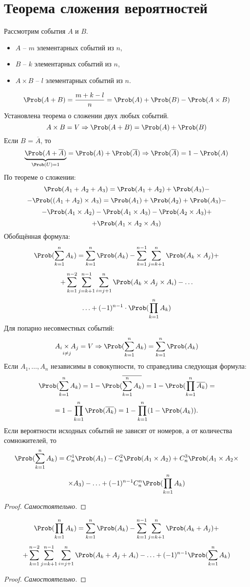 \section{Теорема сложения вероятностей}
Рассмотрим события $A$ и $B$.
\begin{itemize}
	\item $A$ -- $m$ элементарных событий из $n$,
	\item $B$ -- $k$ элементарных событий из $n$,
	\item $A \times B$ -- $l$ элементарных событий из $n$.
\end{itemize}
\[
	\Prob(A + B) = \frac{m + k - l}{n} = \Prob(A) + \Prob(B) - \Prob(A \times B)
\]
Установлена теорема о сложении двух любых событий.
\[
	A \times B = V \Rightarrow \Prob(A + B) = \Prob(A) + \Prob(B)
\]
Если $B$ = $\overline{A}$, то
\[
	\underbrace{\Prob(A + \overline{A})}_{\Prob(U) = 1} = \Prob(A) + \Prob(\overline{A}) \Rightarrow \Prob(\overline{A}) = 1 - \Prob(A)
\]
По теореме о сложении:
\[ \Prob(A_1 + A_2 + A_3) = \Prob(A_1 + A_2) + \Prob(A_3) -  \]
\[ - \Prob((A_1 + A_2) \times A_3) = \Prob(A_1) + \Prob(A_2) + \Prob(A_3) - \]	
\[ - \Prob(A_1 \times A_2) - \Prob(A_1 \times A_3) - \Prob(A_2 \times A_3) + \]
\[ + \Prob(A_1 \times A_2 \times A_3) \]
Обобщённая формула:
\[ \Prob(\sum\limits_{k=1}^n A_k) = \sum\limits_{k=1}^n \Prob(A_k) - \sum\limits_{k=1}^{n-1} \sum\limits_{j=k+1}^n \Prob(A_k \times A_j) + \]
\[
	+ \sum\limits_{k=1}^{n-2} \sum\limits_{j=k+1}^{n-1} \sum\limits_{i=j+1}^n \Prob(A_k \times A_j \times A_i) - \ldots 
\]
\[
	\ldots + (-1)^{n-1} \cdot \Prob(\prod\limits_{k=1}^n A_k)
\]
Для попарно несовместных событий:
\[
	\underset{i \not= j}{A_i \times A_j} = V \Rightarrow \Prob(\sum\limits_{k=1}^n A_k) = \sum\limits_{k=1}^n \Prob(A_k)
\]
Если $A_1, \dots, A_n$ независимы в совокупности, то справедлива следующая формула:
\[
	\Prob(\sum\limits_{k=1}^n A_k) = 1 - \Prob(\overline{\sum\limits_{k=1}^n A_k}) = 1 - \Prob(\prod\limits_{k=1}^n \overline{A_k}) =
\]
\[ = 1 - \prod\limits_{k=1}^n \Prob(\overline{A_k}) = 1 - \prod\limits_{k=1}^n(1 - \Prob(A_k)). \]
Если вероятности исходных событий не зависят от номеров, а от количества сомножителей, то
\[ \Prob(\sum\limits_{k=1}^n A_k) = C_n^1 \Prob(A_1) - C_n^2 \Prob(A_1 \times A_2) + C_n^3 \Prob(A_1 \times A_2 \times \]
\[ \times A_3) - \ldots + (-1)^{n-1} C_n^n \Prob(\prod\limits_{k=1}^n A_k) \]
\begin{proof}
	\textit{Самостоятельно.}
\end{proof}
\[ \Prob(\prod\limits_{k=1}^n A_k) = \sum\limits_{k=1}^n \Prob(A_k) - \sum\limits_{k=1}^{n-1} \sum\limits_{j=k+1}^{n} \Prob(A_k + A_j) + \]
\[ + \sum\limits_{k=1}^{n-2} \sum\limits_{j=k+1}^{n-1} \sum\limits_{i=j+1}^{n} \Prob(A_k + A_j + A_i) - \ldots + (-1)^{n-1} \Prob(\sum\limits_{k=1}^n A_k) \]
\begin{proof}
	\textit{Самостоятельно.}
\end{proof}
